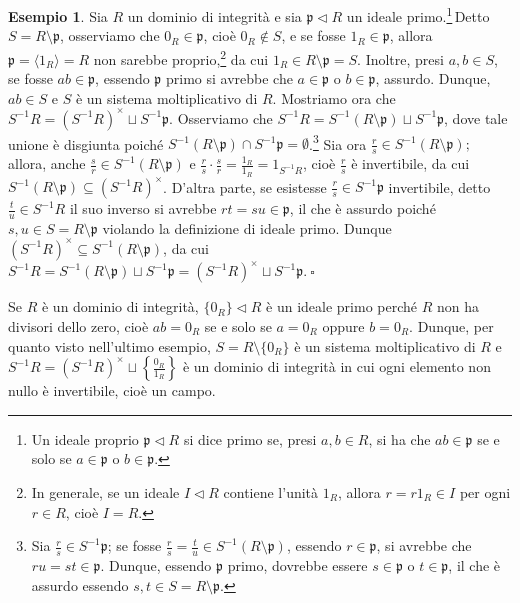 \documentclass{article}
\theoremstyle{definition}
\newtheorem*{exm}{Esempio}
\begin{document}
\begin{exm}Sia $R$ un dominio di integrità e sia $\mathfrak{p}\lhd R$ un ideale primo.\footnote{Un ideale proprio $\mathfrak{p}\lhd R$ si dice primo se, presi $a,b\in R$, si ha che $ab\in \mathfrak{p}$ se e solo se $a\in \mathfrak{p}$ o $b\in \mathfrak{p}$.}\,Detto $S=R\setminus \mathfrak{p}$, osserviamo che $0_R\in \mathfrak{p}$, cioè $0_R\not\in S$, e se fosse $1_R \in\mathfrak{p}$, allora $\mathfrak{p}=\langle 1_R\rangle =R$ non sarebbe proprio,\footnote{In generale, se un ideale $I\lhd R$ contiene l'unità $1_R$, allora $r=r1_R\in I$ per ogni $r\in R$, cioè $I=R$.} da cui $1_R\in R\setminus \mathfrak{p}=S$. Inoltre, presi $a,b\in S$, se fosse $ab\in \mathfrak{p}$, essendo $\mathfrak{p}$ primo si avrebbe che $a\in \mathfrak{p}$ o $b\in\mathfrak{p}$, assurdo. Dunque, $ab\in S$ e $S$ è un sistema moltiplicativo di $R.$ Mostriamo ora che $S^{-1}R=(S^{-1}R)^{\times}\sqcup S^{-1}\mathfrak{p}$. Osserviamo che $S^{-1}R=S^{-1}(R\setminus \mathfrak{p}) \sqcup S^{-1}\mathfrak{p}$, dove tale unione è disgiunta poiché $S^{-1}(R\setminus \mathfrak{p}) \cap S^{-1}\mathfrak{p}=\emptyset$.\footnote{Sia $\frac{r}{s}\in S^{-1}\mathfrak{p}$; se fosse $\frac{r}{s}=\frac{t}{u}\in S^{-1}(R\setminus\mathfrak{p})$, essendo $r\in \mathfrak{p}$, si avrebbe che $ru=st\in \mathfrak{p}$. Dunque, essendo $\mathfrak{p}$ primo, dovrebbe essere $s\in \mathfrak{p}$ o $t\in\mathfrak{p}$, il che è assurdo essendo $s,t \in S=R\setminus\mathfrak{p}$.} Sia ora $\frac{r}{s}\in S^{-1}(R\setminus\mathfrak{p});$ allora, anche $\frac{s}{r}\in S^{-1}(R\setminus\mathfrak{p})$ e $\frac{r}{s}\cdot \frac{s}{r}=\frac{1_R}{1_R}=1_{S^{-1}R}$, cioè $\frac{r}{s}$ è invertibile, da cui $S^{-1}(R\setminus\mathfrak{p})\subseteq (S^{-1}R)^{\times}$. D'altra parte, se esistesse $\frac{r}{s}\in S^{-1}\mathfrak{p}$ invertibile, detto $\frac{t}{u}\in S^{-1}R$ il suo inverso si avrebbe $rt=su\in \mathfrak{p}$, il che è assurdo poiché $s,u \in S=R\setminus \mathfrak{p}$ violando la definizione di ideale primo. Dunque $(S^{-1}R)^{\times}\subseteq S^{-1}(R\setminus\mathfrak{p})$, da cui $S^{-1}R=S^{-1}(R\setminus \mathfrak{p}) \sqcup S^{-1}\mathfrak{p}=(S^{-1}R)^{\times}\sqcup S^{-1}\mathfrak{p}. \ \square$\end{exm}

\noindent Se $R$ è un dominio di integrità, $\{0_R\}\lhd R$ è un ideale primo perché $R$ non ha divisori dello zero, cioè $ab=0_R$ se e solo se $a=0_R$ oppure $b=0_R$. Dunque, per quanto visto nell'ultimo esempio, $S=R\setminus \{0_R\}$ è un sistema moltiplicativo di $R$ e $S^{-1}R=(S^{-1}R)^{\times} \sqcup \left\{ \frac{0_R}{1_R} \right\}$ è un dominio di integrità in cui ogni elemento non nullo è invertibile, cioè un campo.
\end{document}
